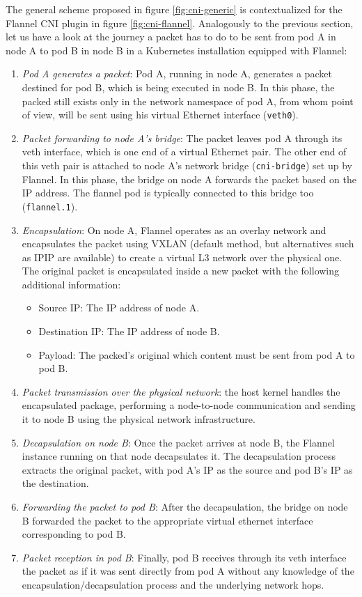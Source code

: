 The general scheme proposed in figure \ref{fig:cni-generic} is contextualized
for the Flannel CNI plugin in figure \ref{fig:cni-flannel}.
Analogously to the previous section, let us have a look at the journey a packet
has to do to be sent from pod A in node A to pod B in node B in a Kubernetes
installation equipped with Flannel:

\begin{enumerate}
  \itemsep0em
  \item \textit{Pod A generates a packet}: Pod A, running in node A, generates a
    packet destined for pod B, which is being executed in node B. In this phase,
    the packed still exists only in the network namespace of pod A, from whom
    point of view, will be sent using his virtual Ethernet interface
    (\texttt{veth0}).
  \item \textit{Packet forwarding to node A's bridge}: The packet leaves pod A
    through its veth interface, which is one end of a virtual Ethernet pair. The
    other end of this veth pair is attached to node A's network bridge
    (\texttt{cni-bridge}) set up by Flannel.
    In this phase, the bridge on node A forwards the packet based on the IP
    address. The flannel pod is typically connected to this bridge too
    (\texttt{flannel.1}).
  \item \textit{Encapsulation}: On node A, Flannel operates as an overlay
    network and encapsulates the packet using VXLAN (default method, but
    alternatives such as IPIP are available) to create a virtual L3 network over
    the physical one.
    The original packet is encapsulated inside a new packet with the following
    additional information:
    \begin{itemize}
      \item Source IP: The IP address of node A.
      \item Destination IP: The IP address of node B.
      \item Payload: The packed's original which content must be sent from pod A to pod B.
    \end{itemize}
  \item \textit{Packet transmission over the physical network}: the host kernel
    handles the encapsulated package, performing a node-to-node communication
    and sending it to node B using the physical network infrastructure.
  \item \textit{Decapsulation on node B}: Once the packet arrives at node B, the
    Flannel instance running on that node decapsulates it. The decapsulation
    process extracts the original packet, with pod A's IP as the source and pod
    B's IP as the destination.
  \item \textit{Forwarding the packet to pod B}: After the decapsulation, the
    bridge on node B forwarded the packet to the appropriate virtual ethernet
    interface corresponding to pod B.
  \item \textit{Packet reception in pod B}: Finally, pod B receives through its
    veth interface the packet as if it was sent directly from pod A without any
    knowledge of the encapsulation/decapsulation process and the underlying
    network hops.
\end{enumerate}


